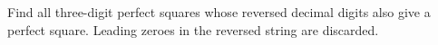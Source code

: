Find all three-digit perfect squares whose reversed decimal digits also give a perfect square. Leading zeroes in the reversed string are discarded.
